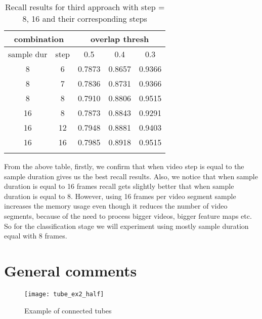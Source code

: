 \begin{center}
\begin{longtable}{||c c||c c c||}

  \hline
  \multicolumn{2}{||c||}{\textbf{combination}} &\multicolumn{3}{|c||}{\textbf{overlap thresh}}\\
  \hline
  sample dur & step &  0.5  &  0.4 &  0.3 \\
  \hline   \hline

  8 & 6 & 0.7873 & 0.8657 & 0.9366  \\
  \hline
  8 & 7 & 0.7836 & 0.8731 & 0.9366  \\
  \hline
  8 &  8 & 0.7910 & 0.8806 & 0.9515 \\
  \hline 

  16 & 8  & 0.7873 & 0.8843 & 0.9291 \\
  \hline
  16 & 12 & 0.7948 & 0.8881 & 0.9403 \\
  \hline
  16 & 16 & 0.7985 & 0.8918 & 0.9515 \\
  \hline 
  \caption{Recall results for third approach with  step = 8, 16 and their
corresponding steps}
  \label{table:conn_app3}
\end{longtable} 
\end{center}

From the above table, firstly, we confirm that when video step is equal to the sample duration gives us the best recall results.
Also, we notice that when sample duration is equal to 16  frames recall gets slightly better that when sample duration is
equal to 8. However, using  16 frames per video segment sample increases the memory usage even though it reduces the number of video segments, because of the
need to process bigger videos, bigger feature maps etc. So for the classification stage we will experiment using mostly sample duration equal
with 8 frames.

\section {General comments}

\begin{figure}[h]
  \centering
  \texttt{[image: tube\_ex2\_half]}
  \caption{Example of connected tubes}
  \label{fig:tube_ex}
\end{figure}

